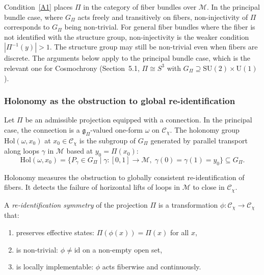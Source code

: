     Condition~\ref{A1} places $\Pi$ in the category of fiber bundles over $\mathcal{M}$.
    In the principal bundle case, where $G_\Pi$ acts freely and transitively on fibers,
    non-injectivity of $\Pi$ corresponds to $G_\Pi$ being non-trivial.
    For general fiber bundles where the fiber is not identified with the structure group,
    non-injectivity is the weaker condition $|\Pi^{-1}(y)| > 1$.
    The structure group may still be non-trivial even when fibers are discrete.
    The arguments below apply to the principal bundle case, which is the relevant one
    for Cosmochrony (Section~5.1, $\Pi \cong S^3$ with
    $G_\Pi \supseteq \mathrm{SU}(2) \times \mathrm{U}(1)$).

  \subsubsection*{Holonomy as the obstruction to global re-identification}
    \label{subsec:stepA-holonomy}

    Let $\Pi$ be an admissible projection equipped with a connection.
    In the principal case, the connection is a $\mathfrak{g}_\Pi$-valued one-form $\omega$ on $\mathcal{C}_\chi$.
    The holonomy group $\mathrm{Hol}(\omega, x_0)$ at $x_0 \in \mathcal{C}_\chi$ is the subgroup of $G_\Pi$
    generated by parallel transport along loops $\gamma$ in $\mathcal{M}$ based at $y_0 = \Pi(x_0)$:
    \begin{equation}
      \mathrm{Hol}(\omega, x_0)
      =
      \bigl\{ P_\gamma \in G_\Pi \;\big|\;
      \gamma : [0,1] \to \mathcal{M},
      \;
      \gamma(0) = \gamma(1) = y_0
      \bigr\}
      \subseteq G_\Pi.
    \end{equation}

    Holonomy measures the obstruction to globally consistent re-identification of fibers.
    It detects the failure of horizontal lifts of loops in $\mathcal{M}$ to close in $\mathcal{C}_\chi$.

    \begin{definition}
      \label{def:re-id-symmetry}
      A \emph{re-identification symmetry} of the projection $\Pi$ is a transformation
      $\phi : \mathcal{C}_\chi \to \mathcal{C}_\chi$ that:
      \begin{enumerate}[label=(\roman*)]
  \item preserves effective states: $\Pi(\phi(x)) = \Pi(x)$ for all $x$,
  \item is non-trivial: $\phi \neq \mathrm{id}$ on a non-empty open set,
  \item is locally implementable: $\phi$ acts fiberwise and continuously.
      \end{enumerate}
    \end{definition}


